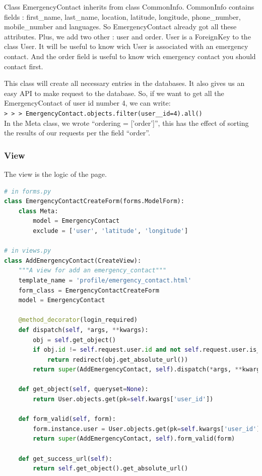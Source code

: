 \documentclass[11pt, a4paper]{article}   	%
\newcommand{\pcmd}[1]{\\\indent\indent\texttt{\footnotesize> > > #1}\\}
\begin{document}
Class EmergencyContact inherits from class CommonInfo. CommonInfo contains fields : first\_name, last\_name, location, latitude, longitude, phone\_number, mobile\_number and languages. So EmergencyContact already got all these attributes. Plus, we add two other : user and order. User is a ForeignKey to the class User. It will be useful to know wich User is associated with an emergency contact. And the order field is useful to know wich emergency contact you should contact first.


This class will create all necessary entries in the databases. It also gives us an easy API to make request to the database. So, if we want to get all the EmergencyContact of user id number 4, we can write:
\pcmd{EmergencyContact.objects.filter(user\_\_id=4).all()}

In the Meta class, we wrote ``ordering = ['order']'', this has the effect of sorting the results of our requests per the field ``order''.

\subsubsection{View}
The view is the logic of the page.

\begin{lstlisting}[language=Python, basicstyle=\footnotesize]
# in forms.py
class EmergencyContactCreateForm(forms.ModelForm):
    class Meta:
        model = EmergencyContact
        exclude = ['user', 'latitude', 'longitude']

# in views.py
class AddEmergencyContact(CreateView):
    """A view for add an emergency_contact"""
    template_name = 'profile/emergency_contact.html'
    form_class = EmergencyContactCreateForm
    model = EmergencyContact

    @method_decorator(login_required)
    def dispatch(self, *args, **kwargs):
        obj = self.get_object()
        if obj.id != self.request.user.id and not self.request.user.is_superuser:
            return redirect(obj.get_absolute_url())
        return super(AddEmergencyContact, self).dispatch(*args, **kwargs)

    def get_object(self, queryset=None):
        return User.objects.get(pk=self.kwargs['user_id'])

    def form_valid(self, form):
        form.instance.user = User.objects.get(pk=self.kwargs['user_id'])
        return super(AddEmergencyContact, self).form_valid(form)

    def get_success_url(self):
        return self.get_object().get_absolute_url()
\end{lstlisting}
\end{document}
